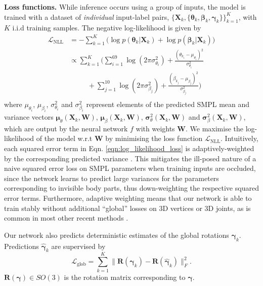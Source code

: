 \documentclass[final]{cvpr}
\begin{document}
\noindent \textbf{Loss functions.} While inference occurs using a group of inputs, the model is trained with a dataset of \textit{individual} input-label pairs, $\{\mathbf{X}_k, \{\boldsymbol{\theta}_k, \boldsymbol{\beta}_k, \boldsymbol{\gamma}_k\}\}_{k=1}^K$, with $K$ i.i.d training samples. The negative log-likelihood is given by 
\begin{equation}
\begin{aligned}
\mathcal{L}_{\text{NLL}} &= - \sum_{k=1}^K \bigg( \log p(\boldsymbol{\theta}_k |\mathbf{X}_k) + \log p(\boldsymbol{\beta}_k |\mathbf{X}_k) \bigg)\\
& \propto \sum_{k=1}^K \bigg( \sum_{i=1}^{69} \log(2\pi \sigma^2_{\theta_i}) + \frac{(\theta_{k_i} - \mu_{\theta_i})^2}{\sigma^2_{\theta_i}} 
\\& \qquad \;\; + \sum_{j=1}^{10} \log(2\pi \sigma^2_{\beta_j}) + \frac{(\beta_{k_j} - \mu_{\beta_j})^2}{\sigma^2_{\beta_j}} \bigg)\\
\end{aligned}
\label{eqn:log_likelihood_loss}
\end{equation}
where $\mu_{\theta_i}$, $\mu_{\beta_i}$, $\sigma^2_{\theta_i}$ and $\sigma^2_{\beta_i}$ represent elements of the predicted SMPL mean and variance vectors $\boldsymbol{\mu}_\theta (\mathbf{X}_k, \mathbf{W})$, $\boldsymbol{\mu}_\beta (\mathbf{X}_k, \mathbf{W})$, $\boldsymbol{\sigma}^2_\theta (\mathbf{X}_k, \mathbf{W})$ and $\boldsymbol{\sigma}^2_\beta (\mathbf{X}_k, \mathbf{W})$, which are output by the neural network $f$ with weights $\mathbf{W}$. We maximise the log-likelihood of the model w.r.t $\mathbf{W}$ by minimising the loss function $\mathcal{L}_{\text{NLL}}$. Intuitively, each squared error term in Eqn. \ref{eqn:log_likelihood_loss} is adaptively-weighted by the corresponding predicted variance \cite{kendall2017whatuncertainties}. This mitigates the ill-posed nature of a naive squared error loss on SMPL parameters when training inputs are occluded, since the network learns to predict large variances for the parameters corresponding to invisible body parts, thus down-weighting the respective squared error terms. Furthermore, adaptive weighting means that our network is able to train stably without additional ``global'' losses on 3D vertices or 3D joints, as is common in most other recent methods \cite{STRAPS2020BMVC,pavlakos2018humanshape,kolotouros2019spin,hmrKanazawa17,zhang2019danet}.

Our network also predicts deterministic estimates of the global rotations $\boldsymbol{\gamma}_k$. Predictions $\boldsymbol{\hat{\gamma}}_k$ are supervised by
\begin{equation}
\mathcal{L}_{\text{glob}} = \sum_{k=1}^K \| \mathbf{R}(\boldsymbol{\gamma}_k) - \mathbf{R}( \boldsymbol{\hat{\gamma}}_k) \|_{F}^2.
\label{eqn:glob_loss}
\end{equation}
$\mathbf{R}(\boldsymbol{\gamma}) \in SO(3)$ is the rotation matrix corresponding to $\boldsymbol{\gamma}$.
\end{document}
